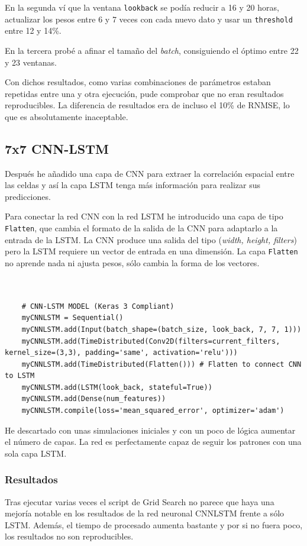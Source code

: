 \documentclass{article}
\begin{document}
En la segunda ví que la ventana \texttt{lookback} se podía reducir a 16 y 20 horas, actualizar los pesos entre 6 y 7 veces con cada nuevo dato y usar un \texttt{threshold} entre 12 y 14\%.

En la tercera probé a afinar el tamaño del \textit{batch}, consiguiendo el óptimo entre 22 y 23 ventanas.

Con dichos resultados, como varias combinaciones de parámetros estaban repetidas entre una y otra ejecución, pude comprobar que no eran resultados reproducibles. La diferencia de resultados era de incluso el 10\% de RNMSE, lo que es absolutamente inaceptable.

\subsection{7x7 CNN-LSTM}
Después he añadido una capa de CNN para extraer la correlación espacial entre las celdas y así la capa LSTM tenga más información para realizar sus predicciones.

Para conectar la red CNN con la red LSTM he introducido una capa de tipo \texttt{Flatten}, que cambia el formato de la salida de la CNN para adaptarlo a la entrada de la LSTM. La CNN produce una salida del tipo (\textit{width, height, filters}) pero la LSTM requiere un vector de entrada en una dimensión. La capa \texttt{Flatten} no aprende nada ni ajusta pesos, sólo cambia la forma de los vectores.

\begin{lstlisting}[style=pythonstyle, caption={Añadido enable\_op\_determinism()}]


    # CNN-LSTM MODEL (Keras 3 Compliant)
    myCNNLSTM = Sequential()
    myCNNLSTM.add(Input(batch_shape=(batch_size, look_back, 7, 7, 1)))
    myCNNLSTM.add(TimeDistributed(Conv2D(filters=current_filters, kernel_size=(3,3), padding='same', activation='relu')))
    myCNNLSTM.add(TimeDistributed(Flatten())) # Flatten to connect CNN to LSTM
    myCNNLSTM.add(LSTM(look_back, stateful=True))
    myCNNLSTM.add(Dense(num_features))
    myCNNLSTM.compile(loss='mean_squared_error', optimizer='adam')

\end{lstlisting}

He descartado con unas simulaciones iniciales y con un poco de lógica aumentar el número de capas. La red es perfectamente capaz de seguir los patrones con una sola capa LSTM.

\subsubsection{Resultados}
Tras ejecutar varias veces el script de Grid Search no parece que haya una mejoría notable en los resultados de la red neuronal CNNLSTM frente a sólo LSTM. Además, el tiempo de procesado aumenta bastante y por si no fuera poco, los resultados no son reproducibles.
\end{document}
